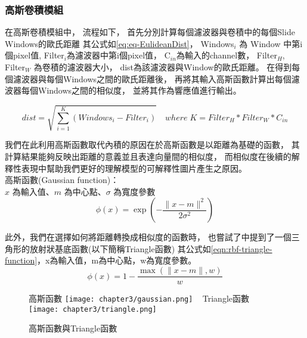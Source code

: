 \documentclass[class=NCU_thesis, crop=false]{standalone}
\begin{document}
		\subsubsection{高斯卷積模組}
			在高斯卷積模組中，
			流程如下，
			首先分別計算每個濾波器與卷積中的每個Slide Windows的歐氏距離
			其公式如\cref{eq:eq-EulideanDist}，
			Windows$_{i}$ 為 Window 中第i個pixel值, 
			Filter$_{i}$為濾波器中第i個pixel值，
			C$_{in}$為輸入的channel數，
			Filter$_{H}$, Filter$_{W}$ 為卷積的濾波器大小，
			dist為該濾波器與Window的歐氏距離。
			在得到每個濾波器與每個Windows之間的歐氏距離後，
			再將其輸入高斯函數計算出每個濾波器每個Windows之間的相似度，
			並將其作為響應值進行輸出。

			\begin{equation}
			    \label{eq:eq-EulideanDist}
			    dist = \sqrt{\sum_{i = 1}^{K} (Windows_{i} - Filter_{i})} \quad where \; K = Filter_{H} * Filter_{W} * C_{in}
			\end{equation}

				我們在此利用高斯函數取代內積的原因在於高斯函數是以距離為基礎的函數，
			其計算結果能夠反映出距離的意義並且表達向量間的相似度，
			而相似度在後續的解釋性表現中幫助我們更好的理解模型的可解釋性圖片產生之原因。\\
			高斯函數(Gaussian function)：\\
			  $x$ 為輸入值、$m$ 為中心點、$\sigma$ 為寬度參數
			  \begin{equation}
			      \label{eqn:rbf-gaussian-function}
			      \phi (x) = \exp \left( -\frac{\| x-m \|^2}{2\sigma ^2} \right) 
			  \end{equation}

		  	此外，我們在選擇如何將距離轉換成相似度的函數時，
		  	也嘗試了\cite{YangCNNInterpretable}中提到了一個三角形的放射狀基底函數(以下簡稱Triangle函數)
		  	其公式如\cref{eqn:rbf-triangle-function}，x為輸入值，m為中心點，w為寬度參數。
		  	\begin{equation}
		      \label{eqn:rbf-triangle-function}
		      \phi (x) = 1 - \frac{ \max \left( \| x-m \|, w \right)}{w}
		  	\end{equation}

		  	\begin{figure}[H]
		    \centering
		    \subcaptionbox
		        {高斯函數
		        \label{fig:gaussian}}
		        {\texttt{[image: chapter3/gaussian.png]}}
		    ~
		    \subcaptionbox
		        {Triangle函數
		        \label{fig:triangle}}
		        {\texttt{[image: chapter3/triangle.png]}}
		    \caption{高斯函數與Triangle函數\cite{YangCNNInterpretable}}
		    \label{fig:rbf}
			\end{figure}
\end{document}
